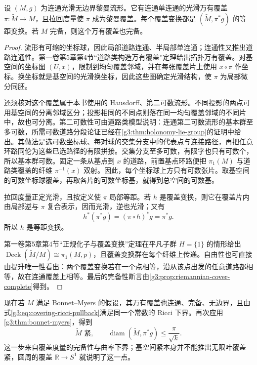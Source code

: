 \begin{proposition}\label{g3:prop:riemannian-universal-cover}
	设 \((M,g)\) 为连通光滑无边界黎曼流形。它有连通单连通的光滑万有覆盖 \(\pi:\widetilde M\to M\)，且拉回度量使 \(\pi\) 成为黎曼覆盖。每个覆盖变换都是 \((\widetilde M,\pi^*g)\) 的等距变换。若 \(M\) 完备，则这个万有覆盖也完备。
\end{proposition}
\begin{proof}
	流形有可缩的坐标球，因此局部道路连通、半局部单连通；连通性又推出道路连通性。第一卷第5章第4节“道路类构造万有覆盖”定理给出拓扑万有覆盖。对基空间的坐标图 \((U,x)\)，限制到均匀覆盖邻域，并在每张覆盖片上使用 \(x\circ\pi\) 作坐标。换坐标就是基空间的光滑换坐标，因此这些图确定光滑结构，使 \(\pi\) 为局部微分同胚。

	还须核对这个覆盖属于本书使用的 Hausdorff、第二可数流形。不同投影的两点可用基空间的分离邻域区分；投影相同的不同点则落在同一均匀覆盖邻域的不同片中，故也可分离。第二可数性可由道路类模型说明：连通第二可数流形的基本群至多可数，所需可数道路分段论证已经在\cref{g3:thm:holonomy-lie-group}的证明中给出。其做法是选可数坐标球、每对球的交集分支中的代表点与连接路径，再把任意环路同伦为这些已选路径的有限拼接。交集分支至多可数，有限字也只有可数个，所以基本群可数。固定一条从基点到 \(x\) 的道路，前置基点环路便把 \(\pi_1(M)\) 与道路类覆盖的纤维 \(\pi^{-1}(x)\) 双射。因此，每个坐标球上方只有可数张片。取基空间的可数坐标球覆盖，再取各片的可数坐标基，就得到总空间的可数基。

	拉回度量正定光滑，且按定义使 \(\pi\) 局部等距。若 \(h\) 是覆盖变换，则它在覆盖片内由局部逆与 \(\pi\) 复合表示，因而光滑，逆也光滑；又有
	\[
		h^*(\pi^*g)=(\pi\circ h)^*g=\pi^*g.
	\]
	所以 \(h\) 是等距变换。

	第一卷第5章第4节“正规化子与覆盖变换”定理在平凡子群 \(H=\{1\}\) 的情形给出 \(\operatorname{Deck}(\widetilde M/M)\cong\pi_1(M,p)\)，且覆盖变换群在每个纤维上传递。自由性也可直接由提升唯一性看出：两个覆盖变换若在一个点相等，沿从该点出发的任意道路都相等，故在连通覆盖上相等。最后的完备性断言由\cref{g3:prop:riemannian-cover-complete}得到。
\end{proof}

现在若 \(M\) 满足 Bonnet--Myers 的假设，其万有覆盖也连通、完备、无边界，且由式\eqref{g3:eq:covering-ricci-pullback}满足同一个常数的 Ricci 下界。再次应用\cref{g3:thm:bonnet-myers}，得到
\begin{equation}\label{g3:eq:myers-universal-cover-compact}
	\widetilde M\text{ 紧},\qquad
	\operatorname{diam}(\widetilde M,\pi^*g)\le\frac\pi{\sqrt{k}}.
\end{equation}
这一步来自覆盖度量的完备性与曲率下界；基空间紧本身并不能推出无限叶覆盖紧，圆周的覆盖 \(\mathbb R\to S^1\) 就说明了这一点。

